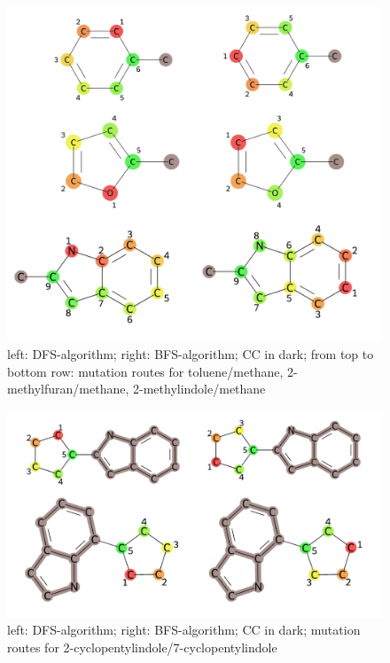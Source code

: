 \begin{figure}[!htb]
	
	\includegraphics[scale=0.75]{paper_routes1a}\caption{left: DFS-algorithm; right: BFS-algorithm; CC in dark; from top to bottom row: mutation routes for toluene/methane, 2-methylfuran/methane, 2-methylindole/methane}
	\label{fig:all_paper_molecules}
\end{figure}


\begin{figure}[!htb]
	
	\includegraphics[scale=0.55]{paper_routes1b}\caption{left: DFS-algorithm; right: BFS-algorithm; CC in dark; mutation routes for 2-cyclopentylindole/7-cyclopentylindole}
	\label{fig:cpi_paper_molecule}
\end{figure}


